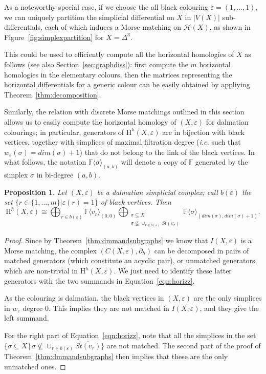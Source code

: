 \documentclass[11pt, a4paper, reqno, twoside, makeidx]{amsart}
\theoremstyle{remark}
\theoremstyle{plain}
\newtheorem{prop}[thm]{Proposition}
\theoremstyle{definition}
\newcommand{\F}{\mathbb{F}}
\newcommand{\HH}{\mathrm{H}}
\newcommand{\hasse}{\mathcal{H}(X)}
\begin{document}
As a noteworthy special case, if we choose the all black colouring $\varepsilon = (1, \ldots, 1)$, we can uniquely partition the simplicial differential on $X$ in $|V(X)|$ sub-differentials, each of which induces a Morse matching on $\hasse$, as shown in Figure~\ref{fig:simplexpartition} for $X = \Delta^3$. 

This could be used to efficiently compute all the horizontal homologies of $X$ as follows (see also  Section~\ref{sec:graphdiss}):
first compute the $m$ horizontal homologies in the elementary colours, then the matrices representing the horizontal differentials for a generic colour can be easily obtained by appliying Theorem~\ref{thm:decomposition}.

Similarly, the relation with discrete Morse matchings outlined in this section allows us to easily compute the horizontal homology of $(X,\varepsilon)$ for dalmatian colourings; in particular, generators of $\HH^h(X, \varepsilon)$ are in bijection with  black vertices, together with simplices of maximal filtration degree (\emph{i.e.} such that $w_\varepsilon (\sigma) = dim(\sigma) +1$) that do not belong to the link of the black vertices. In what follows, the notation $\F\langle \sigma\rangle_{(a,b)}$ will denote a copy of $\F$ generated by the simplex $\sigma$ in bi-degree $(a,b)$.

\begin{prop}\label{prop:dalmatianhor}
Let $(X,\varepsilon)$ be a dalmatian simplicial complex; call $b(\varepsilon)$ the set $\{r\in \{1,\ldots, m\}|\varepsilon(r) = 1 \}$ of black vertices. Then 
\begin{equation}\label{eqn:horizz}
\HH^h(X,\varepsilon) \cong \bigoplus_{r \in b(\varepsilon)} \F\langle v_r\rangle_{(0,0)}
\bigoplus_{\substack{\sigma \subseteq X \\ \sigma \nsubseteq \cup_{r \in b(\varepsilon)} \overline{St(v_r)}}} 
\F \langle \sigma \rangle_{(dim(\sigma), dim(\sigma)+1)}.
\end{equation}
\end{prop}
\begin{proof}
Since by Theorem~\ref{thm:dmmandsubgraphs} we know that $I(X, \varepsilon)$ is a Morse matching, the complex $\left( C(X, \varepsilon), \partial_h \right)$ can be decomposed in pairs of matched generators (which constitute an acyclic pair), or unmatched generators, which are non-trivial in $\HH^h(X, \varepsilon)$. We just need to identify these latter generators with the two summands in Equation~\eqref{eqn:horizz}. 

As the colouring is dalmatian, the black vertices in $(X, \varepsilon)$ are the only simplices in $w_\varepsilon$ degree $0$. This implies they are not matched in $I(X, \varepsilon)$, and they give the left summand. 

For the right part of Equation~\eqref{eqn:horizz}, note that all the simplices in the set $\{\sigma \subseteq X\,|\, \sigma \nsubseteq \cup_{r \in b(\varepsilon)} \overline{St(v_r)}\}$ are not matched. The second part of the proof of Theorem~\ref{thm:dmmandsubgraphs} then implies that these are the only unmatched ones.
\end{proof}
\end{document}
